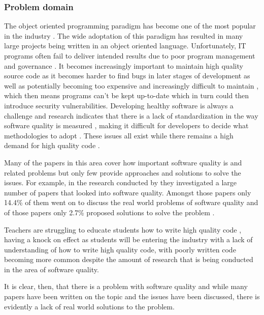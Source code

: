 \subsubsection{Problem domain}

The object oriented programming paradigm has become one of the most popular in the industry \citep{6606742}. The wide adoptation of this paradigm has resulted in many large projects being written in an object oriented language.
Unfortunately, IT programs often fail to deliver intended results due to poor program management and governance \citep{7372958}. It becomes increasingly important to maintain high quality source code as it becomes harder to find bugs in later stages of development \citep{8681007} as well as potentially becoming too expensive and increasingly difficult to maintain \citep{8802820, 10.1145/2507288.2507312, 10.1145/3379597.3387457, 6606742, 7372958}, which then means programs can't be kept up-to-date which in turn could then introduce security vulnerabilities.
Developing healthy software is always a challenge \citep{8681007} and research indicates that there is a lack of standardization in the way software quality is measured \citep{6606742, 8681007}, making it difficult for developers to decide what methodologies to adopt \citep{6606742}. These issues all exist while there remains a high demand for high quality code \citep{6606742}.

Many of the papers in this area cover how important software quality is and related problems but only few provide approaches and solutions to solve the issues. For example, in the research conducted by \cite{6606742} they investigated a large number of papers that looked into software quality. Amongst those papers only 14.4\% of them went on to discuss the real world problems of software quality and of those papers only 2.7\% proposed solutions to solve the problem \cite{6606742}.

Teachers are struggling to educate students how to write high quality code \citep{10.1145/3428029.3428047}, having a knock on effect as students will be entering the industry with a lack of understanding of how to write high quality code, with poorly written code becoming more common despite the amount of research that is being conducted in the area of software quality.

It is clear, then, that there is a problem with software quality and while many papers have been written on the topic and the issues have been discussed, there is evidently a lack of real world solutions to the problem.
